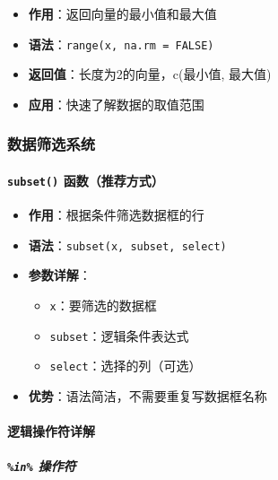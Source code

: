 \documentclass[
]{book}
\providecommand{\tightlist}{%
  \setlength{\itemsep}{0pt}\setlength{\parskip}{0pt}}
\begin{document}
\begin{itemize}
\tightlist
\item
  \textbf{作用}：返回向量的最小值和最大值
\item
  \textbf{语法}：\texttt{range(x,\ na.rm\ =\ FALSE)}
\item
  \textbf{返回值}：长度为2的向量，c(最小值, 最大值)
\item
  \textbf{应用}：快速了解数据的取值范围
\end{itemize}

\hypertarget{ux6570ux636eux7b5bux9009ux7cfbux7edf}{%
\subsubsection{数据筛选系统}\label{ux6570ux636eux7b5bux9009ux7cfbux7edf}}

\hypertarget{subset-ux51fdux6570ux63a8ux8350ux65b9ux5f0f}{%
\paragraph{\texorpdfstring{\texttt{subset()} 函数（推荐方式）}{subset() 函数（推荐方式）}}\label{subset-ux51fdux6570ux63a8ux8350ux65b9ux5f0f}}

\begin{itemize}
\tightlist
\item
  \textbf{作用}：根据条件筛选数据框的行
\item
  \textbf{语法}：\texttt{subset(x,\ subset,\ select)}
\item
  \textbf{参数详解}：

  \begin{itemize}
  \tightlist
  \item
    \texttt{x}：要筛选的数据框
  \item
    \texttt{subset}：逻辑条件表达式
  \item
    \texttt{select}：选择的列（可选）
  \end{itemize}
\item
  \textbf{优势}：语法简洁，不需要重复写数据框名称
\end{itemize}

\hypertarget{ux903bux8f91ux64cdux4f5cux7b26ux8be6ux89e3}{%
\paragraph{逻辑操作符详解}\label{ux903bux8f91ux64cdux4f5cux7b26ux8be6ux89e3}}

\hypertarget{in-ux64cdux4f5cux7b26}{%
\subparagraph{\texorpdfstring{\texttt{\%in\%} 操作符}{\%in\% 操作符}}\label{in-ux64cdux4f5cux7b26}}
\end{document}
